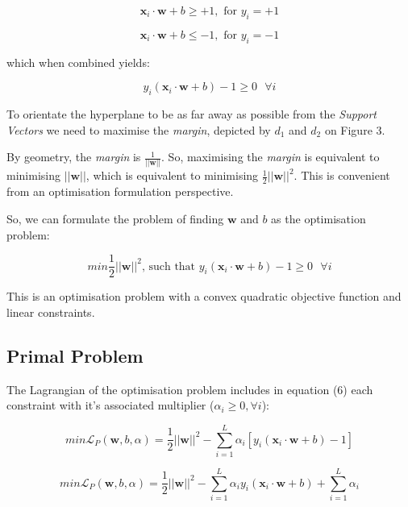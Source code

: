 \documentclass[10pt, a4paper,reqno]{amsart}
\begin{document}
\begin{equation}
\mathbf{x}_i\cdot\mathbf{w} + b \geq +1,\text{ for }y_i = +1
\end{equation}

\begin{equation}
\mathbf{x}_i\cdot\mathbf{w} + b \leq -1,\text{ for }y_i = -1
\end{equation}

which when combined yields:

\begin{equation}
y_i(\mathbf{x}_i\cdot\mathbf{w} + b) - 1 \geq 0\text{ }\forall{i}
\end{equation}

To orientate the hyperplane to be as far away as possible from the \emph{Support Vectors} we need to maximise the \emph{margin}, depicted by $d_1$ and $d_2$ on Figure 3.

By geometry, the \emph{margin} is $\frac{1}{||\mathbf{w}||}$. So, maximising the \emph{margin} is equivalent to minimising $||\mathbf{w}||$, which is equivalent to minimising $\frac{1}{2}||\mathbf{w}||^2$. This is convenient from an optimisation formulation perspective.

So, we can formulate the problem of finding $\mathbf{w}$ and $b$ as the optimisation problem:

\begin{equation}
min\frac{1}{2}||\mathbf{w}||^2\text{, such that }y_i(\mathbf{x}_i\cdot\mathbf{w} + b) - 1 \geq 0\text{ }\forall{i}
\end{equation}

This is an optimisation problem with a convex quadratic objective function and linear constraints.
\subsection{Primal Problem}

The Lagrangian of the optimisation problem includes in equation (6) each constraint with it's associated multiplier ($\alpha_i \geq 0, \forall i$):

\begin{equation}
min\mathcal{L}_P(\mathbf{w}, b, \alpha) = \frac{1}{2}||\mathbf{w}||^2 - \sum_{i=1}^{L}\alpha_i[y_i(\mathbf{x}_i\cdot\mathbf{w} + b) - 1]
\end{equation}

\begin{equation}
min\mathcal{L}_P(\mathbf{w}, b, \alpha) = \frac{1}{2}||\mathbf{w}||^2 - \sum_{i=1}^{L}\alpha_i y_i(\mathbf{x}_i\cdot\mathbf{w} + b) + \sum_{i=1}^{L}\alpha_i
\end{equation}
\end{document}

